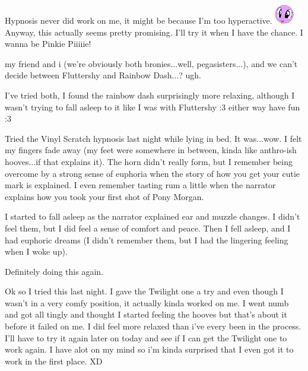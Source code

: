 \documentclass[ebook,12pt,oneside,openany]{memoir}
\newcommand{\mytexttilde}{\raisebox{0.5ex}{\texttildelow}}
\begin{document}
\begin{tcolorbox}[title=Pulcinella]
\par{Hypnosis never did work on me, it might be because I'm too hyperactive. \includegraphics{images/mlp_eW9KEfP.png} Anyway, this actually seems pretty promising. I'll try it when I have the chance. I wanna be Pinkie Piiiiie!}
\end{tcolorbox}
\begin{tcolorbox}[title=\mytexttilde{}Chaotic Parsley\mytexttilde{},colback=cyan!5!white,colframe=cyan!75!black,coltitle=white]
\begin{tcolorbox}[title=AzuelFox102]
\par{my friend and i (we're obviously both bronies...well, pegasisters...), and we can't decide between Fluttershy and Rainbow Dash...? ugh.}
\end{tcolorbox}
\par{I've tried both, I found the rainbow dash surprisingly more relaxing, although I wasn't trying to fall asleep to it like I was with Fluttershy :3 either way have fun :3}
\end{tcolorbox}
\begin{tcolorbox}[title=\mytexttilde{}Master\mytexttilde{} Button Mash]
\par{Tried the Vinyl Scratch hypnosis last night while lying in bed. It was...wow. I felt my fingers fade away (my feet were somewhere in between, kinda like anthro-ish hooves...if that explains it). The horn didn't really form, but I remember being overcome by a strong sense of euphoria when the story of how you get your cutie mark is explained. I even remember tasting rum a little when the narrator explains how you took your first shot of Pony Morgan. }
\newline{}
\par{I started to fall asleep as the narrator explained ear and muzzle changes. I didn't feel them, but I did feel a sense of comfort and peace. Then I fell asleep, and I had euphoric dreams (I didn't remember them, but I had the lingering feeling when I woke up).}
\newline{}
\par{Definitely doing this again.}
\end{tcolorbox}
\begin{tcolorbox}[title=AngelofDeath]
\par{Ok so I tried this last night. I gave the Twilight one a try and even though I wasn't in a very comfy position, it actually kinda worked on me. I went numb and got all tingly and thought I started feeling the hooves but that's about it before it failed on me. I did feel more relaxed than i've every been in the process. I'll have to try it again later on today and see if I can get the Twilight one to work again. I have alot on my mind so i'm kinda surprised that I even got it to work in the first place. XD}
\end{tcolorbox}
\end{document}
